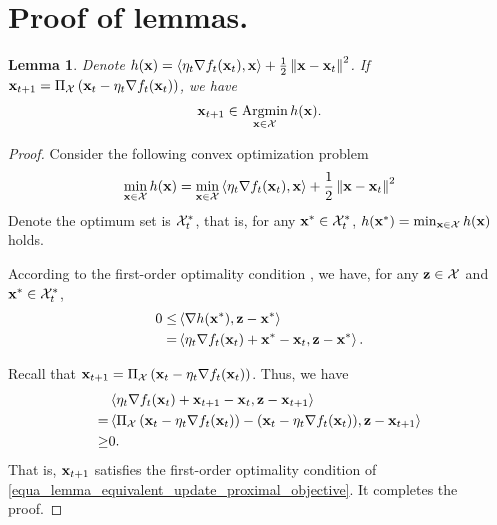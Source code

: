 \documentclass[journal]{IEEEtran}
\newtheorem{Lemma}{\bf{Lemma}}
\begin{document}
\section*{ Proof of lemmas.}

\begin{Lemma}
\label{lemma_equivalent_update_proximal}
Denote $h({\bf x} )  = \left\langle\eta_t \nabla f_t({\bf x}_t), {\bf x} \right\rangle + \frac{1}{2}\left\lVert{\bf x} - {\bf x}_t\right\rVert^2$.  If ${\bf x}_{t+1} = \Pi_{{\mathcal{X}}} \left(  {\bf x}_t - \eta_t \nabla f_t({\bf x}_t)  \right)$, we have
\begin{align}
\nonumber
\x_{t+1} \in \Argmin_{\x\in\Xcal} h(\x).
\end{align}

\end{Lemma}
\begin{proof}
Consider the following convex optimization problem 
\begin{align}
\label{equa_lemma_equivalent_update_proximal_objective}
\min_{\x\in \Xcal} h(\x )  = \min_{\x\in \Xcal} \lrangle {\eta_t \nabla f_t(\x_t), \x} + \frac{1}{2}\lrnorm {\x - \x_t}^2
\end{align} Denote the optimum set is ${\mathcal{X}}_t^{\ast}$, that is, for any ${\bf x}^\ast \in {\mathcal{X}}_t^{\ast}$, $h({\bf x}^\ast) = \min_{{\bf x}\in {\mathcal{X}}} h({\bf x} )$ holds. 

According to the first-order optimality condition \cite{Boyd:2004}, we have, for any ${\bf z}\in{\mathcal{X}}$ and ${\bf x}^\ast\in{\mathcal{X}}_t^\ast$,
\begin{align}
\nonumber
0 \le & \lrangle{ \nabla h(\x^\ast), \z - \x^\ast} \\ \label{equa_lemma_equivalent_update_proximal}
= & \lrangle{ \eta_t \nabla f_t(\x_t) + \x^\ast - \x_t, \z - \x^\ast}.
\end{align} 

Recall that ${\bf x}_{t+1} = \Pi_{{\mathcal{X}}} \left(  {\bf x}_t - \eta_t \nabla f_t({\bf x}_t)  \right)$.
Thus, we have
\begin{align}
\nonumber
& \left\langle \eta_t \nabla f_t({\bf x}_t) + {\bf x}_{t+1} - {\bf x}_t, {\bf z} - {\bf x}_{t+1} \right\rangle \\ \nonumber
= & \left\langle \Pi_{{\mathcal{X}}} \left(  {\bf x}_t - \eta_t \nabla f_t({\bf x}_t)  \right) - ({\bf x}_t - \eta_t \nabla f_t({\bf x}_t)), {\bf z} - {\bf x}_{t+1} \right\rangle \\ \nonumber
\ge & 0.
\end{align}  That is, ${\bf x}_{t+1}$ satisfies the first-order optimality condition of \eqref{equa_lemma_equivalent_update_proximal_objective}. It completes the proof.

\end{proof}
\end{document}
